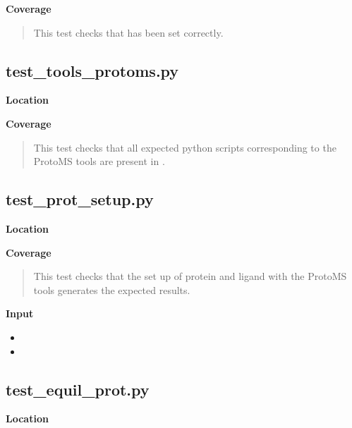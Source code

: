 \documentclass[letterpaper,10pt,english]{sphinxmanual}
\begin{document}
\textbf{Coverage}
\begin{quote}

This test checks that  has been set correctly.
\end{quote}


\subsection{test\_tools\_protoms.py}
\label{testsuite:test-tools-protoms-py}
\textbf{Location}
\begin{quote}

\end{quote}

\textbf{Coverage}
\begin{quote}

This test checks that all expected python scripts corresponding to the ProtoMS tools are present in .
\end{quote}


\subsection{test\_prot\_setup.py}
\label{testsuite:test-prot-setup-py}
\textbf{Location}
\begin{quote}

\end{quote}

\textbf{Coverage}
\begin{quote}

This test checks that the set up of protein and ligand with the ProtoMS tools generates the expected results.
\end{quote}

\textbf{Input}
\begin{itemize}
\item {} 

\item {} 

\end{itemize}


\subsection{test\_equil\_prot.py}
\label{testsuite:test-equil-prot-py}
\textbf{Location}
\begin{quote}

\end{quote}
\end{document}
